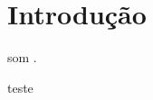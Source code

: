 \chapter{Introdução}
\label{chap:intro}

\gls{som} \citep{som}.

teste \citep{Chen:2014:DPA:2568225.2568259}








